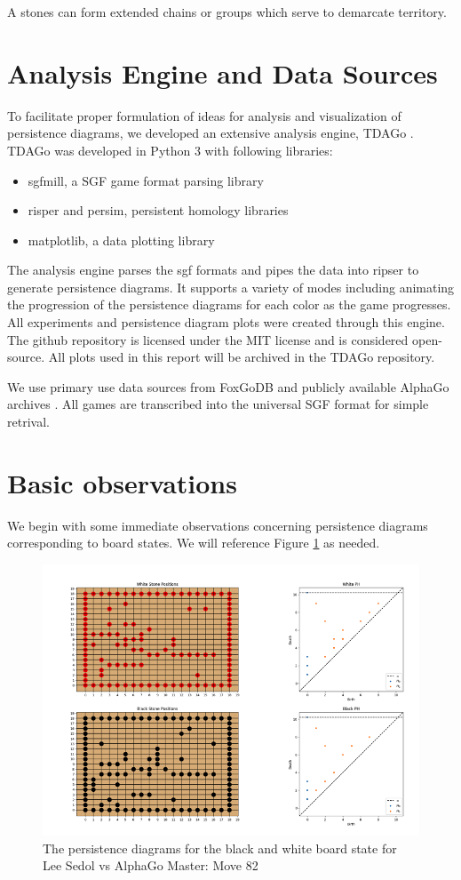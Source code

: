 \documentclass[12pt]{article}
\begin{document}
A stones can form extended chains or groups which serve to demarcate territory.


\section{Analysis Engine and Data Sources}

To facilitate proper formulation of ideas for analysis and visualization of persistence diagrams, we developed an extensive analysis engine, TDAGo \cite{tdago}. TDAGo was developed in Python 3 with following libraries:
\begin{itemize}
   \item sgfmill, a SGF game format parsing library
   \item risper and persim, persistent homology libraries
   \item matplotlib, a data plotting library
\end{itemize}

The analysis engine parses the sgf formats and pipes the data into ripser to generate persistence diagrams. It supports a variety of modes including animating the progression of the persistence diagrams for each color as the game progresses. All experiments and persistence diagram plots were created through this engine. The github repository is licensed under the MIT license and is considered open-source. All plots used in this report will be archived in the TDAGo repository.

We use primary use data sources from FoxGoDB \cite{fox} and publicly available AlphaGo archives \cite{alphalib}. All games are transcribed into the universal SGF format for simple retrival.

\section{Basic observations}

We begin with some immediate observations concerning persistence diagrams corresponding to board states. We will reference Figure \ref{fig:lsd1} as needed.
\begin{figure}[ht]
  \centering
  \includegraphics{lsd1.png}
  \caption{The persistence diagrams for the black and white board state for Lee Sedol vs AlphaGo Master: Move 82}
  \label{fig:lsd1}
\end{figure}
\end{document}
